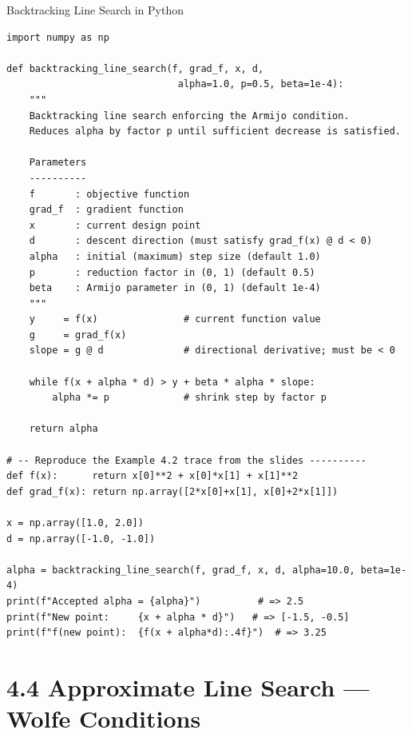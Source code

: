 \documentclass[aspectratio=169,10pt]{beamer}
\begin{document}
\begin{frame}[fragile]{Backtracking Line Search in Python}

\begin{lstlisting}[style=pycode]
import numpy as np

def backtracking_line_search(f, grad_f, x, d,
                              alpha=1.0, p=0.5, beta=1e-4):
    """
    Backtracking line search enforcing the Armijo condition.
    Reduces alpha by factor p until sufficient decrease is satisfied.

    Parameters
    ----------
    f       : objective function
    grad_f  : gradient function
    x       : current design point
    d       : descent direction (must satisfy grad_f(x) @ d < 0)
    alpha   : initial (maximum) step size (default 1.0)
    p       : reduction factor in (0, 1) (default 0.5)
    beta    : Armijo parameter in (0, 1) (default 1e-4)
    """
    y     = f(x)               # current function value
    g     = grad_f(x)
    slope = g @ d              # directional derivative; must be < 0

    while f(x + alpha * d) > y + beta * alpha * slope:
        alpha *= p             # shrink step by factor p

    return alpha

# -- Reproduce the Example 4.2 trace from the slides ----------
def f(x):      return x[0]**2 + x[0]*x[1] + x[1]**2
def grad_f(x): return np.array([2*x[0]+x[1], x[0]+2*x[1]])

x = np.array([1.0, 2.0])
d = np.array([-1.0, -1.0])

alpha = backtracking_line_search(f, grad_f, x, d, alpha=10.0, beta=1e-4)
print(f"Accepted alpha = {alpha}")          # => 2.5
print(f"New point:     {x + alpha * d}")   # => [-1.5, -0.5]
print(f"f(new point):  {f(x + alpha*d):.4f}")  # => 3.25
\end{lstlisting}

\end{frame}

\section{4.4 Approximate Line Search --- Wolfe Conditions}
\end{document}
